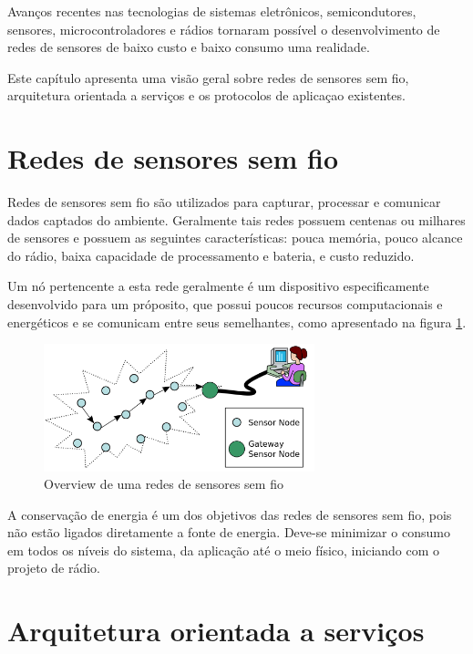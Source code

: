 Avan\c{c}os recentes nas tecnologias de sistemas eletr\^onicos, semicondutores, sensores, microcontroladores e r\'adios tornaram poss\'ivel o desenvolvimento de redes de sensores de baixo custo e baixo consumo uma realidade.

Este cap\'itulo apresenta uma vis\~ao geral sobre redes de sensores sem fio, arquitetura orientada a servi\c{c}os e os protocolos de aplica\c{c}ao existentes.

\section{Redes de sensores sem fio}

Redes de sensores sem fio s\~ao utilizados para capturar, processar e comunicar dados captados do ambiente. Geralmente tais redes possuem centenas ou milhares de sensores e possuem as seguintes caracter\'isticas: pouca mem\'oria, pouco alcance do r\'adio, baixa capacidade de processamento e bateria, e custo reduzido.

Um n\'o pertencente a esta rede geralmente \'e um dispositivo especificamente desenvolvido para um pr\'oposito, que possui poucos recursos computacionais e energ\'eticos e se comunicam entre seus semelhantes, como apresentado na figura \ref{fig:a}.

\begin{figure}
   \label{fig:a}
   \centering
   \includegraphics[width=0.7\textwidth]{figuras/wsn.png}
   \caption{Overview de uma redes de sensores sem fio}
\end{figure}

A conserva\c{c}\~ao de energia \'e um dos objetivos das redes de sensores sem fio, pois n\~ao est\~ao ligados diretamente a fonte de energia. Deve-se minimizar o consumo em todos os n\'iveis do sistema, da aplica\c{c}\~ao at\'e o meio f\'isico, iniciando com o projeto de r\'adio. \cite{WsnSurvey2008} 


\section{Arquitetura orientada a servi\c{c}os}

